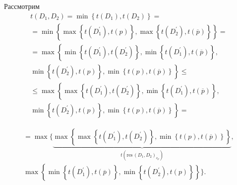 \begin{multicols}{2}
\begin{figure*}[b]
\begin{center}
{
  }
  \end{center}
  \end{figure*}
  
  Рассмотрим
  \begin{multline*}
  t(D_1,D_2) =\min \left\{ t(D_1), t(D_2)\right\} ={}\\
  {}= \min\left\{ \max \left\{
  t(D_1^\prime), t(p)\right\}, \max \left\{ t(D_2^\prime), 
t(\overline{p})\right\}\right\}={}\\
 {}=
  \max\left\{ \min \left\{ t(D_1^\prime), t(D_2^\prime)\right\}, \min\left\{ 
t(D_1^\prime), t(\overline{p})\right\},\right.\\
\left.
  \min\left\{ t(D_2^\prime), t(p)\right\}, \min \left\{ t(p), 
t(\overline{p})\right\}\right\}\leq{}\\
 {}\leq
    \max\left\{ \max\left\{ t(D_1^\prime), t(D_2^\prime)\right\}, \min\left\{ 
t(D_1^\prime), t(\overline{p})\right\},\right.\\
\left.
  \min\left\{ t(D_2^\prime), t(p)\right\}, \min \left\{ t(p), 
t(\overline{p})\right\}\right\}={}
\end{multline*}

\noindent  
\begin{multline*}
    =\!
  \max\!\Bigg\{\!
  \underbrace{\max\!\left\{ \max\left\{ t(D_1^\prime), t(D_2^\prime)\right\}\!, 
\min\left\{ t(p), t(\overline{p})\right\}\!\right\}}_{t(\mathrm{res}\,(D_1,D_2)_{c_p})}, \\[2pt]
\max\left\{ \min \left\{ t(D_1^\prime), t(\overline{p})\right\}, \min\left\{ 
t(D_2^\prime), t(p)\right\}\right\}\Bigg\}.
  \end{multline*}
  

\end{multicols}
